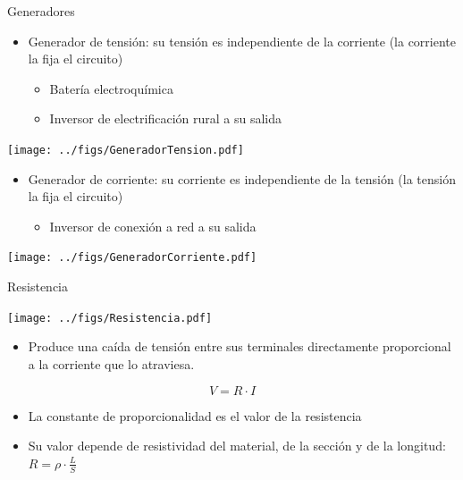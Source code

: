 \documentclass[xcolor={usenames,svgnames,dvipsnames}]{beamer}
\begin{document}
\begin{frame}[label={sec:orgd8c20f5}]{Generadores}
\begin{itemize}
\item \alert{Generador de tensión}: su tensión es independiente de la corriente
(la corriente la fija el circuito)

\begin{itemize}
\item Batería electroquímica

\item Inversor de electrificación rural a su salida
\end{itemize}
\end{itemize}
\begin{center}
\texttt{[image: ../figs/GeneradorTension.pdf]}
\end{center}

\begin{itemize}
\item \alert{Generador de corriente}: su corriente es independiente de la tensión
(la tensión la fija el circuito)

\begin{itemize}
\item Inversor de conexión a red a su salida
\end{itemize}
\end{itemize}
\begin{center}
\texttt{[image: ../figs/GeneradorCorriente.pdf]}
\end{center}
\end{frame}

\begin{frame}[label={sec:org53375c3}]{Resistencia}
\begin{center}
\texttt{[image: ../figs/Resistencia.pdf]}
\end{center}


\begin{itemize}
\item \alert{Produce una caída de tensión entre sus terminales directamente
proporcional a la corriente que lo atraviesa}.
\end{itemize}
\[
V=R\cdot I
\]
\begin{itemize}
\item La constante de proporcionalidad es el valor de la resistencia

\item Su valor depende de resistividad del material, de la sección y de la
longitud: \(R=\rho\cdot\frac{L}{S}\)
\end{itemize}
\end{frame}
\end{document}
